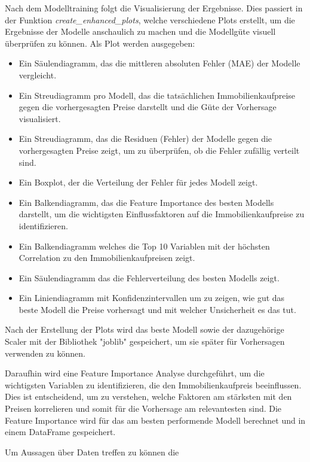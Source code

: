 Nach dem Modelltraining folgt die Visualisierung der Ergebnisse. Dies passiert in der Funktion \textit{create\_enhanced\_plots}, welche verschiedene Plots erstellt, um die Ergebnisse der Modelle anschaulich zu machen und die Modellgüte visuell überprüfen zu können.
Als Plot werden ausgegeben:
\begin{itemize}
    \item Ein Säulendiagramm, das die mittleren absoluten Fehler (MAE) der Modelle vergleicht.
    \item Ein Streudiagramm pro Modell, das die tatsächlichen Immobilienkaufpreise gegen die vorhergesagten Preise darstellt und die Güte der Vorhersage visualisiert.
    \item Ein Streudiagramm, das die Residuen (Fehler) der Modelle gegen die vorhergesagten Preise zeigt, um zu überprüfen, ob die Fehler zufällig verteilt sind.
    \item Ein Boxplot, der die Verteilung der Fehler für jedes Modell zeigt.
    \item Ein Balkendiagramm, das die Feature Importance des besten Modells darstellt, um die wichtigsten Einflussfaktoren auf die Immobilienkaufpreise zu identifizieren.
    \item Ein Balkendiagramm welches die Top 10 Variablen mit der höchsten Correlation zu den Immobilienkaufpreisen zeigt.
    \item Ein Säulendiagramm das die Fehlerverteilung des besten Modells zeigt.
    \item Ein Liniendiagramm mit Konfidenzintervallen um zu zeigen, wie gut das beste Modell die Preise vorhersagt und mit welcher Unsicherheit es das tut.
\end{itemize}

Nach der Erstellung der Plots wird das beste Modell sowie der dazugehörige Scaler mit der Bibliothek "joblib" gespeichert, um sie später für Vorhersagen verwenden zu können. 

Daraufhin wird eine Feature Importance Analyse durchgeführt, um die wichtigsten Variablen zu identifizieren, die den Immobilienkaufpreis beeinflussen. Dies ist entscheidend, um zu verstehen, welche Faktoren am stärksten mit den Preisen korrelieren und somit für die Vorhersage am relevantesten sind. Die Feature Importance wird für das am besten performende Modell berechnet und in einem DataFrame gespeichert.

Um Aussagen über Daten treffen zu können die 